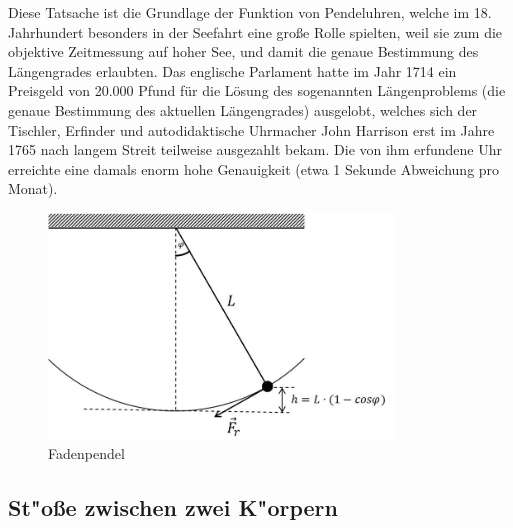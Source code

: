 Diese Tatsache ist die Grundlage der Funktion von Pendeluhren, welche im 18. Jahrhundert besonders in der Seefahrt eine große Rolle spielten, weil sie zum die objektive Zeitmessung auf hoher See, und damit die genaue Bestimmung des Längengrades erlaubten. Das englische Parlament hatte im Jahr 1714 ein Preisgeld von 20.000 Pfund für die Lösung des sogenannten Längenproblems (die genaue Bestimmung des aktuellen Längengrades) ausgelobt, welches sich der Tischler, Erfinder und autodidaktische Uhrmacher John Harrison erst im Jahre 1765 nach langem Streit teilweise ausgezahlt bekam. Die von ihm erfundene Uhr erreichte eine damals enorm hohe Genauigkeit (etwa 1 Sekunde Abweichung pro Monat).
%
\begin{figure}[hb]
	\centering
		\includegraphics[height=6cm]{Abbildungen/Fadenpendel.jpg}
	\caption{Fadenpendel}
	\label{fig:Fadenpendel}
\end{figure}

\subsection{St"o{\ss}e zwischen zwei K"orpern}

